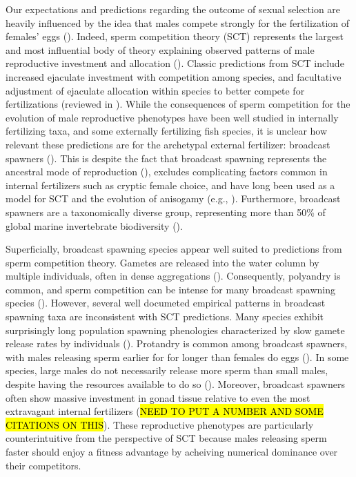 \documentclass{article}
\begin{document}
Our expectations and predictions regarding the outcome of sexual selection are heavily influenced by the idea that males compete strongly for the fertilization of females' eggs (\citealt{Bateman1948, Parker1972, Parker1982}). Indeed, sperm competition theory (SCT) represents the largest and most influential body of theory explaining observed patterns of male reproductive investment and allocation (\citealt{Parker1972, Parker1982,Wedell2002}). Classic predictions from SCT include increased ejaculate investment with competition among species, and facultative adjustment of ejaculate allocation within species to better compete for fertilizations (reviewed in \citealt{Wedell2002}). While the consequences of sperm competition for the evolution of male reproductive phenotypes have been well studied in internally fertilizing taxa, and some externally fertilizing fish species, it is unclear how relevant these predictions are for the archetypal external fertilizer: broadcast spawners (\citealt{BodeMarshall2007, Olito2015}). This is despite the fact that broadcast spawning represents the ancestral mode of reproduction (\citealt{RouFitz1994}), excludes complicating factors common in internal fertilizers such as cryptic female choice, and have long been used as a model for SCT and the evolution of anisogamy (e.g., \citealt{Parker1972, Parker1982}). Furthermore, broadcast spawners are a taxonomically diverse group, representing more than 50\% of global marine invertebrate biodiversity (\citealt{MonroMarshall2015}).

Superficially, broadcast spawning species appear well suited to predictions from sperm competition theory. Gametes are released into the water column by multiple individuals, often in dense aggregations (\citealt{McEuan1988,Levitan1998,Levitan2002, Levitan2004, Marshall2002}). Consequently, polyandry is common, and sperm competition can be intense for many broadcast spawning species (\citealt{Levitan2002, Levitan2004}). However, several well documeted empirical patterns in broadcast spawning taxa are inconsistent with SCT predictions. Many species exhibit surprisingly long population spawning phenologies characterized by slow gamete release rates by individuals (\citealt{McEuan1988,MarshallBolton2007}). Protandry is common among broadcast spawners, with males releasing sperm earlier for for longer than females do eggs (\citealt{McEuan1988, LotterhosLevitan2011, Levitan2005, MarshallBolton2007}). In some species, large males do not necessarily release more sperm than small males, despite having the resources available to do so (\citealt{Styan2003}). Moreover, broadcast spawners often show massive investment in gonad tissue relative to even the most extravagant internal fertilizers (\hl{NEED TO PUT A NUMBER AND SOME CITATIONS ON THIS}). These reproductive phenotypes are particularly counterintuitive from the perspective of SCT because males releasing sperm faster should enjoy a fitness advantage by acheiving numerical dominance over their competitors. 
\end{document}
